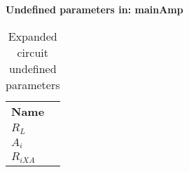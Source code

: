 {\textbf{Undefined parameters in: mainAmp}}

\begin{table}[H]
\centering
\begin{tabular}[c]{l}
\textbf{Name} \\ 
\rowcolor{myyellow}
$R_{L}$ \\ 
$A_{i}$ \\ 
\rowcolor{myyellow}
$R_{i XA}$ \\ 
\end{tabular}
\caption{Expanded circuit undefined parameters}
\end{table}

